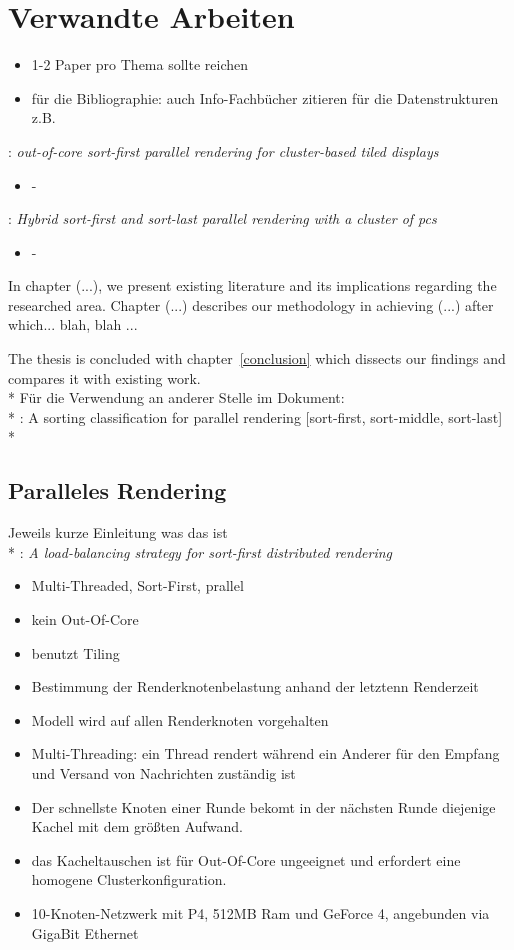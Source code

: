 \chapter{Verwandte Arbeiten}
\label{relatedwork}

\begin{itemize}
 \item 1-2 Paper pro Thema sollte reichen
 \item für die Bibliographie: auch Info-Fachbücher zitieren für die Datenstrukturen z.B.
\end{itemize}


\cite{wagner1}: \textit{out-of-core sort-first parallel rendering for cluster-based tiled displays}
\begin{itemize}
 \item -
\end{itemize}

\cite{samanta}: \textit{Hybrid sort-first and sort-last parallel rendering with a cluster of pcs}
\begin{itemize}
 \item -
\end{itemize}

In chapter (...), we present existing literature and its implications regarding
the researched area. Chapter (...) describes our methodology in achieving (...)
after which... blah, blah ...

The thesis is concluded with chapter~\ref{conclusion} which dissects our
findings and compares it with existing work.\\*
Für die Verwendung an anderer Stelle im Dokument:\\*
\cite{molnar}: A sorting classification for parallel rendering [sort-first, sort-middle, sort-last]\\*
\section{Paralleles Rendering}
Jeweils kurze Einleitung was das ist\\*
\cite{abraham}: \textit{A load-balancing strategy for sort-first distributed rendering}
\begin{itemize}
 \item Multi-Threaded, Sort-First, prallel
 \item kein Out-Of-Core
 \item benutzt Tiling
 \item Bestimmung der Renderknotenbelastung anhand der letztenn Renderzeit
 \item Modell wird auf allen Renderknoten vorgehalten
 \item Multi-Threading: ein Thread rendert während ein Anderer für den Empfang und Versand von Nachrichten zuständig ist
 \item Der schnellste Knoten einer Runde bekomt in der nächsten Runde diejenige Kachel mit dem größten Aufwand.
 \item das Kacheltauschen ist für Out-Of-Core ungeeignet und erfordert eine homogene Clusterkonfiguration.
 \item 10-Knoten-Netzwerk mit P4, 512MB Ram und GeForce 4, angebunden via GigaBit Ethernet
\end{itemize}

